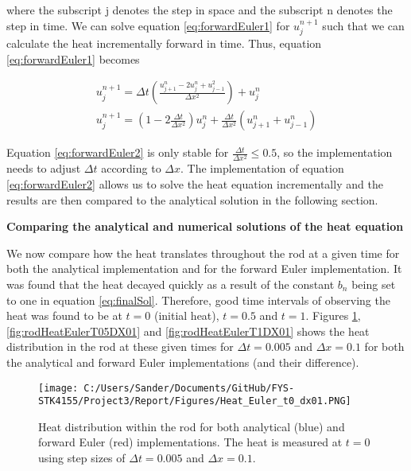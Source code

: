 \documentclass[12pt,a4paper]{article}
\begin{document}
\noindent where the subscript j denotes the step in space and the subscript n denotes the step in time. We can solve equation \ref{eq:forwardEuler1} for $u_j^{n+1}$ such that we can calculate the heat incrementally forward in time. Thus, equation \ref{eq:forwardEuler1} becomes

\begin{equation}\label{eq:forwardEuler2}
\begin{aligned}
u_j^{n+1} = \Delta t(\frac{u_{j+1}^n - 2u_j^n + u_{j-1}^2}{\Delta x^2})+u_j^n
\\
u_j^{n+1} = (1-2\frac{\Delta t}{\Delta x^2})u_j^n + \frac{\Delta t}{\Delta x^2}(u_{j+1}^n + u_{j-1}^n)
\end{aligned}
\end{equation}

\noindent Equation \ref{eq:forwardEuler2} is only stable for $\frac{\Delta t}{\Delta x^2} \leq 0.5$, so the implementation needs to adjust $\Delta t$ according to $\Delta x$. The implementation of equation \ref{eq:forwardEuler2} allows us to solve the heat equation incrementally and the results are then compared to the analytical solution in the following section.

\begin{center}
\large{\textbf{Comparing the analytical and numerical solutions of the heat equation}}
\end{center}

\noindent We now compare how the heat translates throughout the rod at a given time for both the analytical implementation and for the forward Euler implementation. It was found that the heat decayed quickly as a result of the constant $b_n$ being set to one in equation \ref{eq:finalSol}. Therefore, good time intervals of observing the heat was found to be at $t = 0$ (initial heat), $t = 0.5$ and $t = 1$. Figures \ref{fig:rodHeatEulerT0DX01}, \ref{fig:rodHeatEulerT05DX01} and \ref{fig:rodHeatEulerT1DX01} shows the heat distribution in the rod at these given times for $\Delta t = 0.005$ and $\Delta x = 0.1$ for both the analytical and forward Euler implementations (and their difference).

\begin{figure}[H]
\centering
\texttt{[image: C:/Users/Sander/Documents/GitHub/FYS-STK4155/Project3/Report/Figures/Heat\_Euler\_t0\_dx01.PNG]}
\caption{\label{fig:rodHeatEulerT0DX01} Heat distribution within the rod for both analytical (blue) and forward Euler (red) implementations. The heat is measured at $t = 0$ using step sizes of $\Delta t = 0.005$ and $\Delta x = 0.1$.}
\end{figure}
\end{document}
